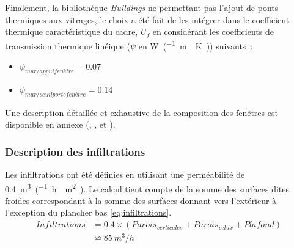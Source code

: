 Finalement, la bibliothèque \textit{Buildings} ne permettant pas l’ajout de ponts
thermiques aux vitrages, le choix a été fait de les intégrer dans le coefficient thermique
caractéristique du cadre, $U_{f}$ en considérant les coefficients de transmission
thermique linéique ($\psi$ en \si{\watt\per(\metre\period\kelvin)}) suivants~:
\begin{itemize}
    \item $\psi_{mur / appui fenêtre} = \num{0.07}$
    \item $\psi_{mur / seuil porte fenêtre} = \num{0.14}$
\end{itemize}
Une description détaillée et exhaustive de la composition des fenêtres est
disponible en annexe (, ,
et ).


\subsubsection{Description des infiltrations} %
\label{ssub:description_des_infiltrations}
Les infiltrations ont été définies en utilisant une perméabilité de
\SI{0.4}{m^{3}\per(\hour\period\meter\squared)}. Le calcul tient compte de la
somme des surfaces dites froides correspondant à la somme des surfaces donnant
vers l’extérieur à l’exception du plancher bas \eqref{eq:infiltrations}.
\begin{equation}
    \begin{aligned}
    Infiltrations &= \num{0.4} \times (Parois_{verticales} + Parois_{velux} + Plafond)\\
    &              \backsimeq \SI{85}{m^{3}/h}
    \label{eq:infiltrations}
    \end{aligned}
\end{equation}


